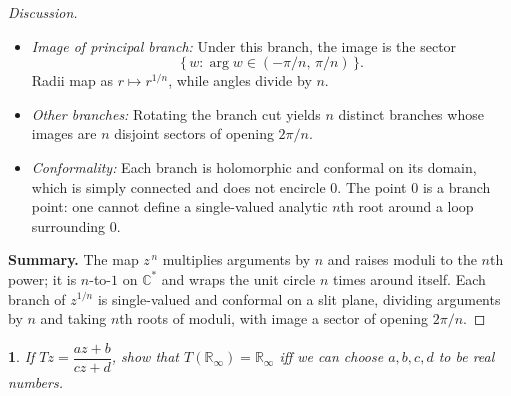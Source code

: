 \documentclass[12pt, a4paper]{report}
\theoremstyle{spaced}
\newtheorem{exercise}{}
\newcommand{\setexercise}[1]{\setcounter{exercise}{#1-1}}
\begin{document}
\begin{proof}[Discussion]
\begin{itemize}
		\item \emph{Image of principal branch:}
		      Under this branch, the image is the sector
		      \[
			      \{\, w : \arg w \in (-\pi/n, \, \pi/n) \,\}.
		      \]
		      Radii map as $r \mapsto r^{1/n}$, while angles divide by $n$.

		\item \emph{Other branches:}
		      Rotating the branch cut yields $n$ distinct branches whose images
		      are $n$ disjoint sectors of opening $2\pi/n$.

		\item \emph{Conformality:}
		      Each branch is holomorphic and conformal on its domain, which is
		      simply connected and does not encircle $0$.
		      The point $0$ is a branch point: one cannot define a single-valued
		      analytic $n$th root around a loop surrounding $0$.
	\end{itemize}

	\medskip
	\noindent
	\textbf{Summary.}
	The map $z^{\,n}$ multiplies arguments by $n$ and raises moduli to the
	$n$th power; it is $n$-to-$1$ on $\mathbb{C}^\ast$ and wraps the unit
	circle $n$ times around itself.
	Each branch of $z^{1/n}$ is single-valued and conformal on a slit
	plane, dividing arguments by $n$ and taking $n$th roots of moduli,
	with image a sector of opening $2\pi/n$.

\end{proof}

\setexercise{8}
\begin{exercise}
	If \(Tz=\dfrac{az+b}{cz+d}\), show that \(T(\mathbb{R}_\infty)=\mathbb{R}_\infty\) iff we can choose \(a,b,c,d\) to be real numbers.
\end{exercise}
\end{document}
